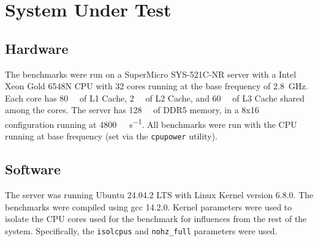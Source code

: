\section{System Under Test}
\subsection{Hardware}
The benchmarks were run on a SuperMicro SYS-521C-NR server with a Intel Xeon Gold 6548N CPU with 32 cores
running at the base frequency of \SI{2.8}{\giga\hertz}.
Each core has \SI{80}{\kilo\byte} of L1 Cache, \SI{2}{\mega\byte} of L2 Cache, and \SI{60}{\mega\byte} of L3
Cache shared among the cores.
The server has \SI{128}{\giga\byte} of DDR5 memory, in a 8x\SI{16}{\giga\byte} configuration running at
\SI{4800}{\mega\transfer\per\second}.
All benchmarks were run with the CPU running at base frequency (set via the \texttt{cpupower} utility).

\subsection{Software}
The server was running Ubuntu 24.04.2 LTS with Linux Kernel version 6.8.0.
The benchmarks were compiled using gcc 14.2.0.
Kernel parameters were used to isolate the CPU cores used for the benchmark for influences from the rest of the system.
Specifically, the \texttt{isolcpus} and \texttt{nohz\_full} parameters were used.
